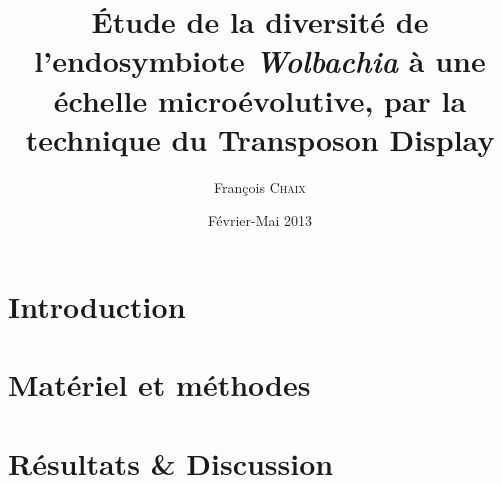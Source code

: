 \documentclass[a4paper, 12pt, linktocpage=true, oneside]{memoir}
\title{Étude de la diversité de l’endosymbiote \textit{Wolbachia} à une échelle microévolutive, par la technique du Transposon Display}
\date{Février-Mai 2013}
\author{François \textsc{Chaix}}
\renewcommand{\baselinestretch}{1.5}
\begin{document}

\tableofcontents

\chapter{Introduction}


\chapter{Matériel et méthodes}


\chapter{Résultats \& Discussion}


\printbibliography

\newpage
\pagestyle{empty}
\renewcommand{\baselinestretch}{1} %
\begin{abstract}
    
\end{abstract}
\end{document}
